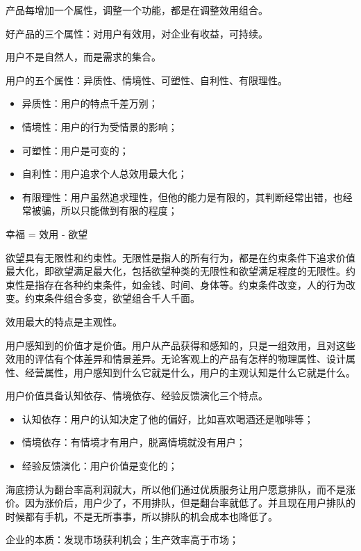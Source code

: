 \documentclass[12pt]{article}
\begin{document}
产品每增加一个属性，调整一个功能，都是在调整效用组合。

好产品的三个属性：对用户有效用，对企业有收益，可持续。

用户不是自然人，而是需求的集合。

用户的五个属性：异质性、情境性、可塑性、自利性、有限理性。
\begin{itemize}
\setlength{\itemsep}{0pt}
\setlength{\parsep}{0pt}
\setlength{\parskip}{0pt}
    \item 异质性：用户的特点千差万别；
    \item 情境性：用户的行为受情景的影响；
    \item 可塑性：用户是可变的；
    \item 自利性：用户追求个人总效用最大化；
    \item 有限理性：用户虽然追求理性，但他的能力是有限的，其判断经常出错，也经常被骗，所以只能做到有限的程度；
\end{itemize}

幸福 = 效用 - 欲望

欲望具有无限性和约束性。无限性是指人的所有行为，都是在约束条件下追求价值最大化，即欲望满足最大化，包括欲望种类的无限性和欲望满足程度的无限性。约束性是指存在各种约束条件，如金钱、时间、身体等。约束条件改变，人的行为改变。约束条件组合多变，欲望组合千人千面。

效用最大的特点是主观性。

用户感知到的价值才是价值。用户从产品获得和感知的，只是一组效用，且对这些效用的评估有个体差异和情景差异。无论客观上的产品有怎样的物理属性、设计属性、经营属性，用户感知到什么它就是什么，用户的主观认知是什么它就是什么。

用户价值具备认知依存、情境依存、经验反馈演化三个特点。
\begin{itemize}
\setlength{\itemsep}{0pt}
\setlength{\parsep}{0pt}
\setlength{\parskip}{0pt}
    \item 认知依存：用户的认知决定了他的偏好，比如喜欢喝酒还是咖啡等；
    \item 情境依存：有情境才有用户，脱离情境就没有用户；
    \item 经验反馈演化：用户价值是变化的；
\end{itemize}

海底捞认为翻台率高利润就大，所以他们通过优质服务让用户愿意排队，而不是涨价。因为涨价后，用户少了，不用排队，但是翻台率就低了。并且现在用户排队的时候都有手机，不是无所事事，所以排队的机会成本也降低了。

企业的本质：发现市场获利机会；生产效率高于市场；
\end{document}
